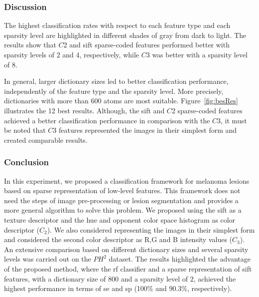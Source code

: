 

\subsubsection{Discussion}
The highest classification rates with respect to each feature type and each sparsity level are highlighted in different shades of gray from dark to light. 
The results show that $C2$ and \ac{sift} sparse-coded features performed better with sparsity levels of 2 and 4, respectively, while $C3$ was better with a sparsity level of 8. 

In general, larger dictionary sizes led to better classification performance, independently of the feature type and the sparsity level.
More precisely, dictionaries with more than 600 atoms are most suitable. 
Figure~\ref{fig:besRes} illustrates the 12 best results. 
Although, the \ac{sift} and $C2$ sparse-coded features achieved a better classification performance in comparison with the $C3$, it must be noted that $C3$ features represented the images in their simplest form and created comparable results. 

\subsubsection{Conclusion}
In this experiment, we proposed a classification framework for melanoma lesions based on sparse representation of low-level features. 
This framework does not need the steps of image pre-processing or lesion segmentation and provides a more general algorithm to solve this problem. 
We proposed using the \ac{sift} as a texture descriptor and the hue and opponent color space histogram as color descriptor ($C_{2}$).
We also considered representing the images in their simplest form and considered the second color descriptor as R,G and B intensity values ($C_{3}$).
An extensive comparison based on different dictionary sizes and several sparsity levels was carried out on the $PH^{2}$ dataset. 
The results highlighted the advantage of the proposed method, where the \ac{rf} classifier and a sparse representation of \ac{sift} features, with a dictionary size of 800 and a sparsity level of 2, achieved the highest performance in terms of \ac{se} and \ac{sp} (100\% and 90.3\%, respectively).
		
	

